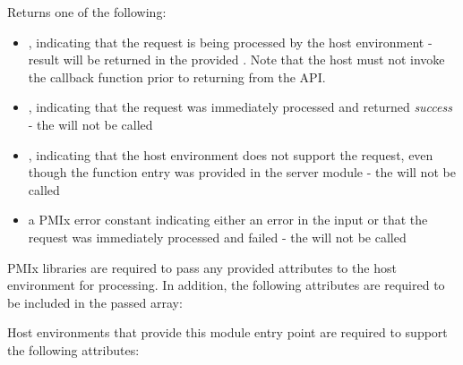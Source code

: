 \begin{arglist}
\end{arglist}

Returns one of the following:

\begin{itemize}
    \item {}, indicating that the request is being processed by the host environment - result will be returned in the provided . Note that the host must not invoke the callback function prior to returning from the \ac{API}.
    \item {}, indicating that the request was immediately processed and returned \textit{success} - the  will not be called
    \item {}, indicating that the host environment does not support the request, even though the function entry was provided in the server module - the  will not be called
    \item a PMIx error constant indicating either an error in the input or that the request was immediately processed and failed - the  will not be called
\end{itemize}

\reqattrstart
\ac{PMIx} libraries are required to pass any provided attributes to the host environment for processing. In addition, the following attributes are required to be included in the passed  array:


\divider

Host environments that provide this module entry point are required to support the following attributes:


\reqattrend

